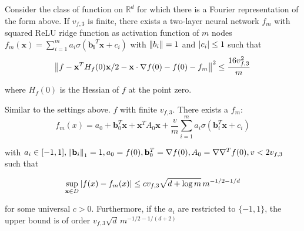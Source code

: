 \begin{theorem}\label{thm:appr_f3} Consider the class of function on
    $\mathbb{R}^d$ for which there is a Fourier representation of the form
    above. If $v_{f, 3}$ is finite, there exists a two-layer neural network
    $f_m$ with squared ReLU ridge function as activation function of $m$ nodes
    $f_m(\mathbf{x}) = \sum_{i=1}^m a_i \sigma(\mathbf{b_i}^T\mathbf{x} + c_i)$
    with $\left\| b_i \right\| = 1$ and $\left| c_i \right|\leq 1$ such that
    \begin{equation}
        \left\| f
            - \mathbf{x}^T H_f(0) \mathbf{x}/2
            - \mathbf{x} \cdot \nabla f(0)
            - f(0)
            - f_m \right\|^2 \leq \frac{16 v_{f, 3}^2}{m}
    \end{equation}

    where $H_f(0)$ is the Hessian of $f$ at the point zero.
\end{theorem}

\begin{theorem}
    Similar to the settings above. $f$ with finite $v_{f,3}$. There exists a
    $f_m$:
    \begin{equation}
        f_m(x) = a_0 + \mathbf{b}_0^T \mathbf{x} + \mathbf{x}^T A_0 \mathbf{x}+ \frac{v}{m} \sum_{i=1}^m a_i \sigma(\mathbf{b}_i^T\mathbf{x} + c_i)
    \end{equation}

    with $a_i \in [-1,1], \left\| \mathbf{b}_i \right\|_1 = 1, a_0 = f(0), \mathbf{b}_0^T
        = \nabla f(0), A_0 = \nabla\nabla^T f(0), v < 2v_{f,3}$ such that

    \begin{equation}
        \sup_{\mathbf{x} \in D} \left| f(x) - f_m(x) \right| \leq c v_{f,3} \sqrt{d+\log{m}} \, m^{-1/2-1/d}
    \end{equation}

    for some universal $c > 0$. Furthermore, if the $a_i$ are restricted to
    $\{-1, 1\}$, the upper bound is of order $v_{f,3} \sqrt{d} \,
        m^{-1/2-1/(d+2)}$
\end{theorem}




